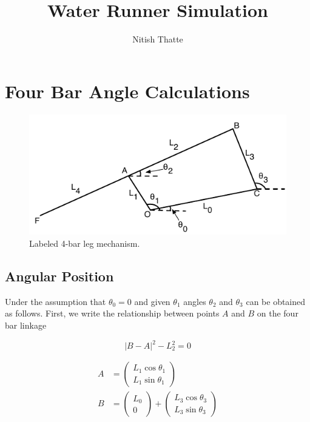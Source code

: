 \documentclass[letterpaper]{article}
\title{Water Runner Simulation}
\author{Nitish Thatte}
\begin{document}
\maketitle

\section{Four Bar Angle Calculations}
\begin{figure}[htb]
	\centering
	\includegraphics{4bar.pdf}
	\caption{Labeled 4-bar leg mechanism.}
	\label{fig:4bar}
\end{figure}
\subsection{Angular Position}
Under the assumption that $\theta_0 = 0$ and given $\theta_1$ angles $\theta_2$ and $\theta_3$ can be obtained as follows. First, we write the relationship between points $A$ and $B$ on the four bar linkage

\begin{equation}
	|B - A|^2 - L_2^2 = 0
	\label{eq:BArel}
\end{equation}

\begin{align}
	A &= \begin{pmatrix} L_1 \cos \theta_1 \\ L_1 \sin \theta_1 \end{pmatrix} \label{eq:Aloc}\\
	B &= \begin{pmatrix} L_0 \\ 0 \end{pmatrix} + \begin{pmatrix} L_3 \cos \theta_3 \\ L_3 \sin \theta_3 \end{pmatrix} \label{eq:Bloc}
\end{align}
\end{document}

